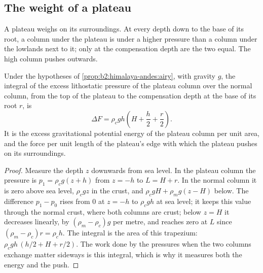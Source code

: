 \subsection{The weight of a plateau}

A plateau weighs on its surroundings. At every depth down to the base of its root, a column
under the plateau is under a higher pressure than a column under the lowlands next to it;
only at the compensation depth are the two equal. The high column pushes outwards.

\begin{proposition}\label{prop:b2:himalaya-andes:gpe}
Under the hypotheses of \cref{prop:b2:himalaya-andes:airy}, with gravity $g$, the integral of
the excess lithostatic pressure of the plateau column over the normal column, from the top
of the plateau to the compensation depth at the base of its root $r$, is
\[
  \Delta F = \rho_c g h \left(H + \frac{h}{2} + \frac{r}{2}\right) .
\]
It is the excess gravitational potential energy of the plateau column per unit area, and the
force per unit length of the plateau's edge with which the plateau pushes on its
surroundings.
\end{proposition}

\begin{proof}
Measure the depth $z$ downwards from sea level. In the plateau column the pressure is $p_1 =
\rho_c g (z + h)$ from $z = -h$ to $L = H + r$. In the normal column it is zero above sea
level, $\rho_c g z$ in the crust, and $\rho_c g H + \rho_m g (z - H)$ below. The difference $p_1
- p_0$ rises from 0 at $z = -h$ to $\rho_c g h$ at sea level; it keeps this value through the
normal crust, where both columns are crust; below $z = H$ it decreases linearly, by
$(\rho_m - \rho_c) g$ per metre, and reaches zero at $L$ since $(\rho_m - \rho_c) r = \rho_c
h$. The integral is the area of this trapezium: $\rho_c g h\,(h/2 + H + r/2)$. The work done by
the pressures when the two columns exchange matter sideways is this integral, which is why it
measures both the energy and the push.
\end{proof}

